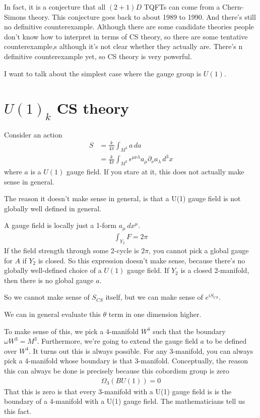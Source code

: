 In fact,
it is a conjecture that all $(2+1)D$ TQFTs can come from a Chern-Simons theory.
This conjecture goes back to about 1989 to 1990.
And there's still no definitive counterexample.
Although there are some candidate theories people don't know how to interpret
in terms of CS theory,
so there are some tentative counterexample,s
although it's not clear whether they actually are.
There's n definitive counterexample yet,
so CS theory is very powerful.

I want to talk about the simplest case where the gauge group is $U(1)$.

\section{$U(1)_k$ CS theory}
Consider an action
\begin{align}
    S &=
    \frac{k}{4\pi}
    \int_{M^3} a\, da\\
    &=
    \frac{k}{4\pi}
    \int_{M^3}
    \epsilon^{\mu\nu\lambda}
    a_\mu
    \partial_\nu
    a_\lambda
    \,
    d^3x
\end{align}
where $a$ is a $U(1)$ gauge field.
If you stare at it,
this does not actually make sense in general.

The reason it doesn't make sense in general,
is that a U(1) gauge field is not globally well defined in general.

A gauge field is locally just a 1-form $a_\mu \, dx^\mu$.
\begin{align}
    \int_{Y_2} F = 2\pi
\end{align}
If the field strength through some 2-cycle is $2\pi$,
you cannot pick a global gauge for $A$ if $Y_2$ is closed.
So this expression doesn't make sense,
because there's no globally well-defined choice of a $U(1)$ gauge field.
If $Y_2$ is a closed 2-manifold,
then there is no global gauge $a$.

So we cannot make sense of $S_{CS}$ itself,
but we can make sense of $e^{iS_{CS}}$.

We can in general evaluate this $\theta$ term in one dimension higher.

To make sense of this,
we pick a 4-manifold $W^4$ such that the boundary
$\omega W^3 = M^3$.
Furthermore,
we're going to extend the gauge field $a$
to be defined over $W^4$.
It turns out this is always possible.
For any 3-manifold,
you can always pick a 4-manifold whose boundary is that 3-manifold.
Conceptually,
the reason this can always be done is precisely because this cobordism group is
zero
\begin{align}
    \Omega_3 \left( BU(1) \right) = 0
\end{align}
That this is zero is that every 3-manifold with a U(1) gauge field is 
is the boundary of a 4-manifold with a U(1) gauge field.
The mathematicians tell us this fact.

